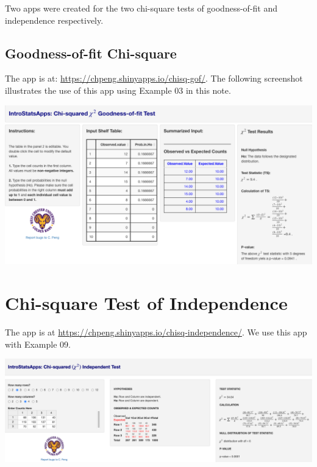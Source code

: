 \documentclass[
]{book}
\begin{document}
Two apps were created for the two chi-square tests of goodness-of-fit and independence respectively.

\hypertarget{goodness-of-fit-chi-square}{%
\subsection{Goodness-of-fit Chi-square}\label{goodness-of-fit-chi-square}}

The app is at: \url{https://chpeng.shinyapps.io/chisq-gof/}. The following screenshot illustrates the use of this app using Example 03 in this note.

\begin{center}\includegraphics[width=1\linewidth]{week13/useTech01} \end{center}

\hypertarget{chi-square-test-of-independence-1}{%
\section{Chi-square Test of Independence}\label{chi-square-test-of-independence-1}}

The app is at \url{https://chpeng.shinyapps.io/chisq-independence/}. We use this app with Example 09.

\begin{center}\includegraphics[width=1\linewidth]{week13/useTech02} \end{center}
\end{document}
